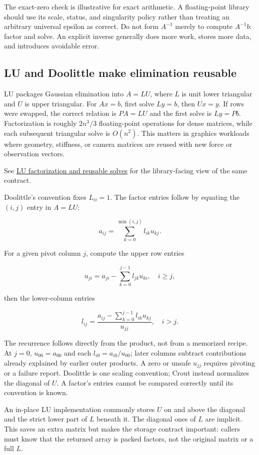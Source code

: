 The exact-zero check is illustrative for exact arithmetic. A floating-point library should use its scale, status, and singularity policy rather than treating an arbitrary universal epsilon as correct. Do not form \(A^{-1}\) merely to compute \(A^{-1}b\): factor and solve. An explicit inverse generally does more work, stores more data, and introduces avoidable error.

\subsection{LU and Doolittle make elimination reusable}\label{lu-and-doolittle-make-elimination-reusable}

LU packages Gaussian elimination into \(A=LU\), where \(L\) is unit lower triangular and \(U\) is upper triangular. For \(Ax=b\), first solve \(Ly=b\), then \(Ux=y\). If rows were swapped, the correct relation is \(PA=LU\) and the first solve is \(Ly=Pb\). Factorization is roughly \(2n^3/3\) floating-point operations for dense matrices, while each subsequent triangular solve is \(O(n^2)\). This matters in graphics workloads where geometry, stiffness, or camera matrices are reused with new force or observation vectors.

See \hyperref[01-foundations-i-ch019]{LU factorization and reusable solves} for the library-facing view of the same contract.

Doolittle's convention fixes \(L_{ii}=1\). The factor entries follow by equating the \((i,j)\) entry in \(A=LU\):

\[
a_{ij}=\sum_{k=0}^{\min(i,j)} l_{ik}u_{kj}.
\]

For a given pivot column \(j\), compute the upper row entries

\[
u_{ji}=a_{ji}-\sum_{k=0}^{j-1}l_{jk}u_{ki},\quad i\ge j,
\]

then the lower-column entries

\[
l_{ij}=\frac{a_{ij}-\sum_{k=0}^{j-1}l_{ik}u_{kj}}{u_{jj}},\quad i>j.
\]

The recurrence follows directly from the product, not from a memorized recipe. At \(j=0\), \(u_{00}=a_{00}\) and each \(l_{i0}=a_{i0}/u_{00}\); later columns subtract contributions already explained by earlier outer products. A zero or unsafe \(u_{jj}\) requires pivoting or a failure report. Doolittle is one scaling convention; Crout instead normalizes the diagonal of \(U\). A factor's entries cannot be compared correctly until its convention is known.

An in-place LU implementation commonly stores \(U\) on and above the diagonal and the strict lower part of \(L\) beneath it. The diagonal ones of \(L\) are implicit. This saves an extra matrix but makes the storage contract important: callers must know that the returned array is packed factors, not the original matrix or a full \(L\).

